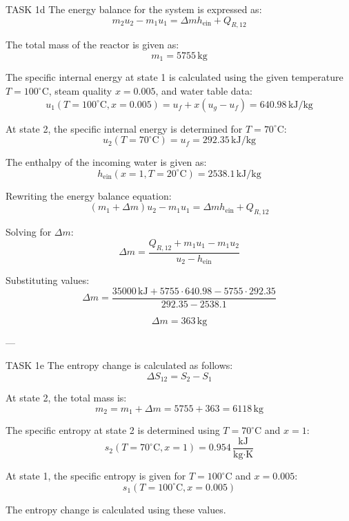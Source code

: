 TASK 1d  
The energy balance for the system is expressed as:  
\[
m_2 u_2 - m_1 u_1 = \Delta m h_{\text{ein}} + Q_{R,12}
\]  

The total mass of the reactor is given as:  
\[
m_1 = 5755 \, \text{kg}
\]  

The specific internal energy at state 1 is calculated using the given temperature \( T = 100^\circ\text{C} \), steam quality \( x = 0.005 \), and water table data:  
\[
u_1(T=100^\circ\text{C}, x=0.005) = u_f + x (u_g - u_f) = 640.98 \, \text{kJ/kg}
\]  

At state 2, the specific internal energy is determined for \( T = 70^\circ\text{C} \):  
\[
u_2(T=70^\circ\text{C}) = u_f = 292.35 \, \text{kJ/kg}
\]  

The enthalpy of the incoming water is given as:  
\[
h_{\text{ein}}(x=1, T=20^\circ\text{C}) = 2538.1 \, \text{kJ/kg}
\]  

Rewriting the energy balance equation:  
\[
(m_1 + \Delta m) u_2 - m_1 u_1 = \Delta m h_{\text{ein}} + Q_{R,12}
\]  

Solving for \( \Delta m \):  
\[
\Delta m = \frac{Q_{R,12} + m_1 u_1 - m_1 u_2}{u_2 - h_{\text{ein}}}
\]  

Substituting values:  
\[
\Delta m = \frac{35000 \, \text{kJ} + 5755 \cdot 640.98 - 5755 \cdot 292.35}{292.35 - 2538.1}
\]  

\[
\Delta m = 363 \, \text{kg}
\]  

---

TASK 1e  
The entropy change is calculated as follows:  
\[
\Delta S_{12} = S_2 - S_1
\]  

At state 2, the total mass is:  
\[
m_2 = m_1 + \Delta m = 5755 + 363 = 6118 \, \text{kg}
\]  

The specific entropy at state 2 is determined using \( T = 70^\circ\text{C} \) and \( x = 1 \):  
\[
s_2(T=70^\circ\text{C}, x=1) = 0.954 \, \frac{\text{kJ}}{\text{kg·K}}
\]  

At state 1, the specific entropy is given for \( T = 100^\circ\text{C} \) and \( x = 0.005 \):  
\[
s_1(T=100^\circ\text{C}, x=0.005)
\]  

The entropy change is calculated using these values.